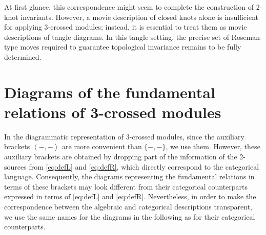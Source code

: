\documentclass[11pt, reqno]{amsart} %
\theoremstyle{definition}
\theoremstyle{remark}
\numberwithin{equation}{section}
\begin{document}
At first glance, this correspondence might seem to complete the construction of 2-knot invariants. However, a movie description of closed knots alone is insufficient for applying 3-crossed modules; instead, it is essential to treat them as movie descriptions of tangle diagrams. In this tangle setting, the precise set of Roseman-type moves required to guarantee topological invariance remains to be fully determined.




\appendix
\section{Diagrams of the fundamental relations of 3-crossed modules}\label{app:3CM-diagram-list}

In the diagrammatic representation of 3-crossed modules, since the auxiliary brackets $\left<-,-\right>$ are more convenient than $\{-,-\}$, we use them. However, these auxiliary brackets are obtained by dropping part of the information of the 2-sources from \eqref{eq:defL} and \eqref{eq:defR}, which directly correspond to the categorical language. Consequently, the diagrams representing the fundamental relations in terms of these brackets may look different from their categorical counterparts expressed in terms of \eqref{eq:defL} and \eqref{eq:defR}. Nevertheless, in order to make the correspondence between the algebraic and categorical descriptions transparent, we use the same names for the diagrams in the following as for their categorical counterparts.
\end{document}
